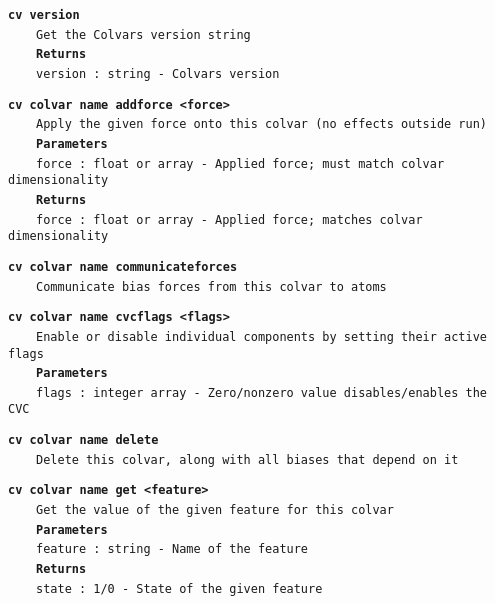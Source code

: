 \begin{mdexampleinput}{}
\texttt{\textbf{cv version}}
\\
\-~~~~\texttt{Get the Colvars version string}
\\
\-~~~~\texttt{\textbf{Returns}}
\\
\-~~~~\texttt{version : string - Colvars version}
\end{mdexampleinput}
\begin{mdexampleinput}{}
\texttt{\textbf{cv colvar name addforce <force>}}
\\
\-~~~~\texttt{Apply the given force onto this colvar (no effects outside run)}
\\
\-~~~~\texttt{\textbf{Parameters}}
\\
\-~~~~\texttt{force : float or array - Applied force; must match colvar dimensionality}
\\
\-~~~~\texttt{\textbf{Returns}}
\\
\-~~~~\texttt{force : float or array - Applied force; matches colvar dimensionality}
\end{mdexampleinput}
\begin{mdexampleinput}{}
\texttt{\textbf{cv colvar name communicateforces}}
\\
\-~~~~\texttt{Communicate bias forces from this colvar to atoms}
\end{mdexampleinput}
\begin{mdexampleinput}{}
\texttt{\textbf{cv colvar name cvcflags <flags>}}
\\
\-~~~~\texttt{Enable or disable individual components by setting their active flags}
\\
\-~~~~\texttt{\textbf{Parameters}}
\\
\-~~~~\texttt{flags : integer array - Zero/nonzero value disables/enables the CVC}
\end{mdexampleinput}
\begin{mdexampleinput}{}
\texttt{\textbf{cv colvar name delete}}
\\
\-~~~~\texttt{Delete this colvar, along with all biases that depend on it}
\end{mdexampleinput}
\begin{mdexampleinput}{}
\texttt{\textbf{cv colvar name get <feature>}}
\\
\-~~~~\texttt{Get the value of the given feature for this colvar}
\\
\-~~~~\texttt{\textbf{Parameters}}
\\
\-~~~~\texttt{feature : string - Name of the feature}
\\
\-~~~~\texttt{\textbf{Returns}}
\\
\-~~~~\texttt{state : 1/0 - State of the given feature}
\end{mdexampleinput}
